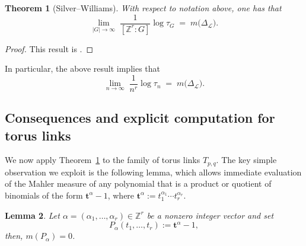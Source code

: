 \documentclass[table]{amsart}
\newtheorem{theorem}{Theorem}[section]
\newtheorem{lemma}[theorem]{Lemma}
\newcommand{\Z}{\mathbb{Z}}
\newcommand{\cL}{\mathcal{L}}
\numberwithin{equation}{section}
\begin{document}
\begin{theorem}[Silver--Williams]\label{thm:SW}
 With respect to notation above, one has that
\[
\lim_{|G|\to\infty}\; \frac{1}{[\Z^r:G]}\log\tau_G \;=\; m\big(\Delta_{\cL}\big).
\]
\end{theorem}
\begin{proof}
    This result is \cite[Theorem 2.1]{SW1}.
\end{proof}
\noindent In particular, the above result implies that 
\[\lim_{n\to\infty}\; \frac{1}{n^r}\log\tau_n \;=\; m\big(\Delta_{\cL}\big).\]

\subsection{Consequences and explicit computation for torus links}

We now apply Theorem~\ref{thm:SW} to the family of torus links $T_{p,q}$. The key simple observation we exploit is the following lemma, which allows immediate evaluation of the Mahler measure of any polynomial that is a product or quotient of binomials of the form $\mathbf{t}^\alpha-1$, where $\mathbf{t}^\alpha:=t_1^{\alpha_1}\cdots t_r^{\alpha_r}$.

\begin{lemma}\label{lem:binomial-mahler-zero}
Let $\alpha=(\alpha_1,\dots,\alpha_r)\in\Z^r$ be a nonzero integer vector and set
\[
P_\alpha(t_1,\dots,t_r):=\mathbf{t}^\alpha-1,
\]
then, $m(P_\alpha)=0$.
\end{lemma}
\end{document}
